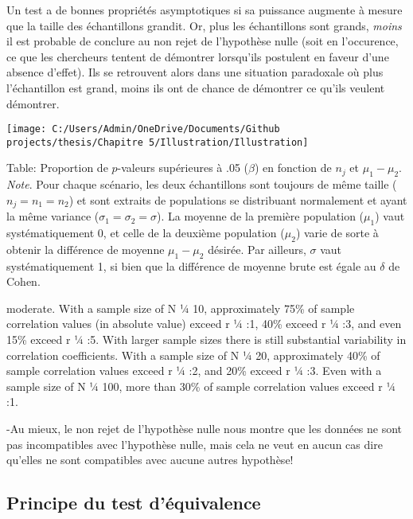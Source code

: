 \documentclass[
  english,
  man]{apa6}
\begin{document}
Un test a de bonnes propriétés asymptotiques si sa puissance augmente à mesure que la taille des échantillons grandit. Or, plus les échantillons sont grands, \emph{moins} il est probable de conclure au non rejet de l'hypothèse nulle (soit en l'occurence, ce que les chercheurs tentent de démontrer lorsqu'ils postulent en faveur d'une absence d'effet). Ils se retrouvent alors dans une situation paradoxale où plus l'échantillon est grand, moins ils ont de chance de démontrer ce qu'ils veulent démontrer.

\begin{center}\texttt{[image: C:/Users/Admin/OneDrive/Documents/Github projects/thesis/Chapitre 5/Illustration/Illustration]} \end{center}

Table: Proportion de \(p\)-valeurs supérieures à .05 (\(\beta\)) en fonction de \(n_j\) et \(\mu_1-\mu_2\).
\emph{Note}. Pour chaque scénario, les deux échantillons sont toujours de même taille (\(n_j=n_1=n_2\)) et sont extraits de populations se distribuant normalement et ayant la même variance (\(\sigma_1=\sigma_2=\sigma\)). La moyenne de la première population (\(\mu_1\)) vaut systématiquement 0, et celle de la deuxième population (\(\mu_2\)) varie de sorte à obtenir la différence de moyenne \(\mu_1-\mu_2\) désirée. Par ailleurs, \(\sigma\) vaut systématiquement 1, si bien que la différence de moyenne brute est égale au \(\delta\) de Cohen.

moderate. With a sample size of N ¼ 10, approximately 75\% of sample correlation values (in absolute value) exceed r ¼ :1, 40\% exceed r ¼ :3, and even 15\% exceed r ¼ :5. With larger sample sizes there is still substantial variability in correlation coefficients. With a sample size of N ¼ 20, approximately 40\% of sample correlation values exceed r ¼ :2, and 20\% exceed r ¼ :3. Even with a sample size of N ¼ 100, more than 30\% of sample correlation values exceed r ¼ :1.

-Au mieux, le non rejet de l'hypothèse nulle nous montre que les données ne sont pas incompatibles avec l'hypothèse nulle, mais cela ne veut en aucun cas dire qu'elles ne sont compatibles avec aucune autres hypothèse!

\hypertarget{principe-du-test-duxe9quivalence}{%
\subsection{Principe du test d'équivalence}\label{principe-du-test-duxe9quivalence}}
\end{document}
